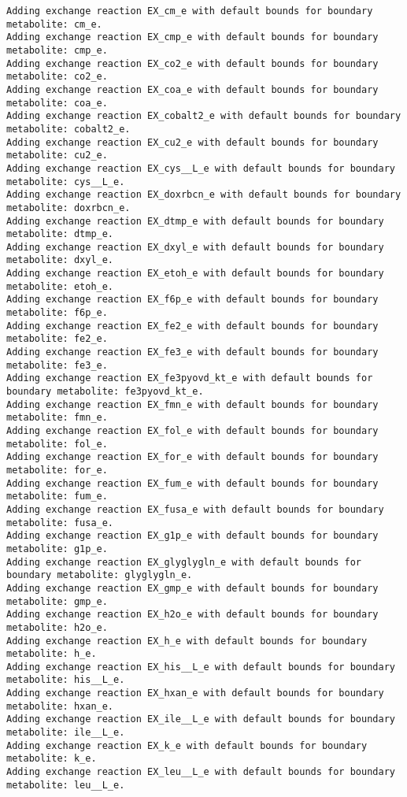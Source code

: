 \documentclass[
  letterpaper,
  DIV=11,
  numbers=noendperiod]{scrartcl}
\begin{document}
\begin{verbatim}
Adding exchange reaction EX_cm_e with default bounds for boundary metabolite: cm_e.
Adding exchange reaction EX_cmp_e with default bounds for boundary metabolite: cmp_e.
Adding exchange reaction EX_co2_e with default bounds for boundary metabolite: co2_e.
Adding exchange reaction EX_coa_e with default bounds for boundary metabolite: coa_e.
Adding exchange reaction EX_cobalt2_e with default bounds for boundary metabolite: cobalt2_e.
Adding exchange reaction EX_cu2_e with default bounds for boundary metabolite: cu2_e.
Adding exchange reaction EX_cys__L_e with default bounds for boundary metabolite: cys__L_e.
Adding exchange reaction EX_doxrbcn_e with default bounds for boundary metabolite: doxrbcn_e.
Adding exchange reaction EX_dtmp_e with default bounds for boundary metabolite: dtmp_e.
Adding exchange reaction EX_dxyl_e with default bounds for boundary metabolite: dxyl_e.
Adding exchange reaction EX_etoh_e with default bounds for boundary metabolite: etoh_e.
Adding exchange reaction EX_f6p_e with default bounds for boundary metabolite: f6p_e.
Adding exchange reaction EX_fe2_e with default bounds for boundary metabolite: fe2_e.
Adding exchange reaction EX_fe3_e with default bounds for boundary metabolite: fe3_e.
Adding exchange reaction EX_fe3pyovd_kt_e with default bounds for boundary metabolite: fe3pyovd_kt_e.
Adding exchange reaction EX_fmn_e with default bounds for boundary metabolite: fmn_e.
Adding exchange reaction EX_fol_e with default bounds for boundary metabolite: fol_e.
Adding exchange reaction EX_for_e with default bounds for boundary metabolite: for_e.
Adding exchange reaction EX_fum_e with default bounds for boundary metabolite: fum_e.
Adding exchange reaction EX_fusa_e with default bounds for boundary metabolite: fusa_e.
Adding exchange reaction EX_g1p_e with default bounds for boundary metabolite: g1p_e.
Adding exchange reaction EX_glyglygln_e with default bounds for boundary metabolite: glyglygln_e.
Adding exchange reaction EX_gmp_e with default bounds for boundary metabolite: gmp_e.
Adding exchange reaction EX_h2o_e with default bounds for boundary metabolite: h2o_e.
Adding exchange reaction EX_h_e with default bounds for boundary metabolite: h_e.
Adding exchange reaction EX_his__L_e with default bounds for boundary metabolite: his__L_e.
Adding exchange reaction EX_hxan_e with default bounds for boundary metabolite: hxan_e.
Adding exchange reaction EX_ile__L_e with default bounds for boundary metabolite: ile__L_e.
Adding exchange reaction EX_k_e with default bounds for boundary metabolite: k_e.
Adding exchange reaction EX_leu__L_e with default bounds for boundary metabolite: leu__L_e.

\end{verbatim}
\end{document}
